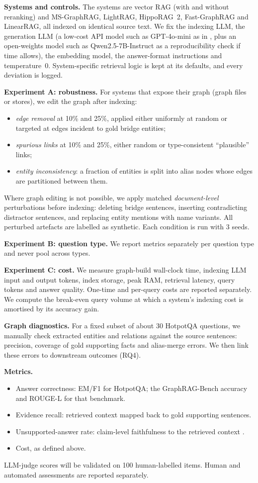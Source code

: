 \documentclass[11pt]{article}
\begin{document}
\textbf{Systems and controls.} The systems are vector RAG (with and without reranking) and MS-GraphRAG, LightRAG, HippoRAG~2, Fast-GraphRAG and LinearRAG, all indexed on identical source text. We fix the indexing LLM, the generation LLM (a low-cost API model such as GPT-4o-mini as in , plus an open-weights model such as Qwen2.5-7B-Instruct as a reproducibility check if time allows), the embedding model, the answer-format instructions and temperature~0. System-specific retrieval logic is kept at its defaults, and every deviation is logged.

\textbf{Experiment A: robustness.} For systems that expose their graph (graph files or stores), we edit the graph after indexing:
\begin{itemize}
\item \emph{edge removal} at 10\% and 25\%, applied either uniformly at random or targeted at edges incident to gold bridge entities;
\item \emph{spurious links} at 10\% and 25\%, either random or type-consistent ``plausible'' links;
\item \emph{entity inconsistency}: a fraction of entities is split into alias nodes whose edges are partitioned between them.
\end{itemize}
Where graph editing is not possible, we apply matched \emph{document-level} perturbations before indexing: deleting bridge sentences, inserting contradicting distractor sentences, and replacing entity mentions with name variants. All perturbed artefacts are labelled as synthetic. Each condition is run with 3 seeds.

\textbf{Experiment B: question type.} We report metrics separately per question type and never pool across types.

\textbf{Experiment C: cost.} We measure graph-build wall-clock time, indexing LLM input and output tokens, index storage, peak RAM, retrieval latency, query tokens and answer quality. One-time and per-query costs are reported separately. We compute the break-even query volume at which a system's indexing cost is amortised by its accuracy gain.

\textbf{Graph diagnostics.} For a fixed subset of about 30 HotpotQA questions, we manually check extracted entities and relations against the source sentences: precision, coverage of gold supporting facts and alias-merge errors. We then link these errors to downstream outcomes (RQ4).

\textbf{Metrics.}
\begin{itemize}
\item Answer correctness: EM/F1 for HotpotQA; the GraphRAG-Bench accuracy and ROUGE-L for that benchmark.
\item Evidence recall: retrieved context mapped back to gold supporting sentences.
\item Unsupported-answer rate: claim-level faithfulness to the retrieved context \cite{es2024ragas}.
\item Cost, as defined above.
\end{itemize}
LLM-judge scores will be validated on 100 human-labelled items. Human and automated assessments are reported separately.
\end{document}
